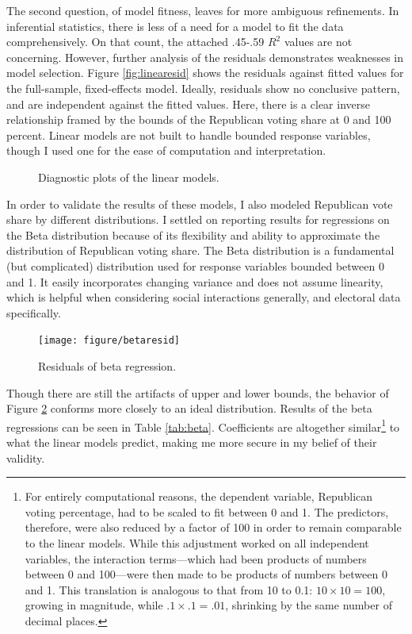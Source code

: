 \documentclass[12pt,oneside]{psthesis}
\begin{document}
The second question, of model fitness, leaves for more ambiguous refinements.
In inferential statistics, there is less of a need for a model to fit the data comprehensively.
On that count, the attached .45-.59 \(R^{2}\) values are not concerning.
However, further analysis of the residuals demonstrates weaknesses in model selection.
Figure \ref{fig:linearesid} shows the residuals against fitted values for the full-sample, fixed-effects model.
Ideally, residuals show no conclusive pattern, and are independent against the fitted values.
Here, there is a clear inverse relationship framed by the bounds of the Republican voting share at 0 and 100 percent.
Linear models are not built to handle bounded response variables, though I used one for the ease of computation and interpretation.
\begin{figure}

{\centering {}

}

\caption{Diagnostic plots of the linear models.}\label{fig:linear}
\end{figure}
In order to validate the results of these models, I also modeled Republican vote share by different distributions.
I settled on reporting results for regressions on the Beta distribution because of its flexibility and ability to approximate the distribution of Republican voting share.
The Beta distribution is a fundamental (but complicated) distribution used for response variables bounded between 0 and 1.
It easily incorporates changing variance and does not assume linearity, which is helpful when considering social interactions generally, and electoral data specifically.
\begin{figure}

{\centering \texttt{[image: figure/betaresid]} 

}

\caption{Residuals of beta regression.}\label{fig:betaresid}
\end{figure}
Though there are still the artifacts of upper and lower bounds, the behavior of Figure \ref{fig:betaresid} conforms more closely to an ideal distribution.
Results of the beta regressions can be seen in Table \ref{tab:beta}.
Coefficients are altogether similar\footnote{For entirely computational reasons, the dependent variable, Republican voting percentage, had to be scaled to fit between 0 and 1. The predictors, therefore, were also reduced by a factor of 100 in order to remain comparable to the linear models. While this adjustment worked on all independent variables, the interaction terms---which had been products of numbers between 0 and 100---were then made to be products of numbers between 0 and 1. This translation is analogous to that from 10 to 0.1: \(10 \times 10 = 100\), growing in magnitude, while \(.1 \times .1 = .01\), shrinking by the same number of decimal places.} to what the linear models predict, making me more secure in my belief of their validity.
\end{document}
